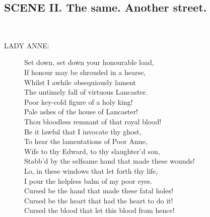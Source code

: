 \documentclass{article}
\begin{document}
\subsection*{SCENE II.  The same. Another street.}
\\
\begin{description}
\item[LADY ANNE:] 
\hspace{1pt}Set down, set down your honourable load,\\
\hspace{1pt}If honour may be shrouded in a hearse,\\
\hspace{1pt}Whilst I awhile obsequiously lament\\
\hspace{1pt}The untimely fall of virtuous Lancaster.\\
\hspace{1pt}Poor key-cold figure of a holy king!\\
\hspace{1pt}Pale ashes of the house of Lancaster!\\
\hspace{1pt}Thou bloodless remnant of that royal blood!\\
\hspace{1pt}Be it lawful that I invocate thy ghost,\\
\hspace{1pt}To hear the lamentations of Poor Anne,\\
\hspace{1pt}Wife to thy Edward, to thy slaughter'd son,\\
\hspace{1pt}Stabb'd by the selfsame hand that made these wounds!\\
\hspace{1pt}Lo, in these windows that let forth thy life,\\
\hspace{1pt}I pour the helpless balm of my poor eyes.\\
\hspace{1pt}Cursed be the hand that made these fatal holes!\\
\hspace{1pt}Cursed be the heart that had the heart to do it!\\
\hspace{1pt}Cursed the blood that let this blood from hence!\\

\end{description}
\end{document}
